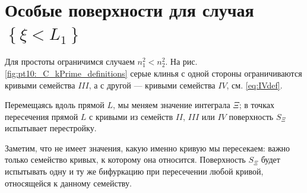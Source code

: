 \section{Особые поверхности для случая $\left\{ \xi < L_1 \right\}$}\label{sec:ch5/sec8}
Для простоты ограничимся случаем  $n_1^2 < n_2^2$. 
На рис. \ref{fig:pt10:_C_kPrime_definitions} серые клинья с одной стороны ограничиваются кривыми семейства $III$, а с другой --- кривыми семейства $IV$, см. \eqref{eq:IVdef}.

Перемещаясь вдоль прямой $L$, мы меняем значение интеграла $\Xi$; в точках пересечения прямой $L$ с кривыми  из семейств $II$, $III$ или $IV$ поверхность $S_\Xi$ испытывает перестройку.

Заметим, что не имеет значения, какую  именно кривую мы пересекаем: важно только семейство кривых, к которому она относится. Поверхность $S_\Xi$ будет испытывать одну и ту же бифуркацию при пересечении любой кривой, относящейся к данному семейству.
 
